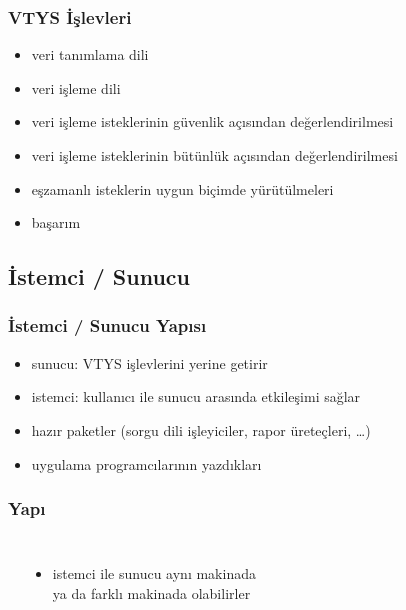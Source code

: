 \documentclass[dvipsnames]{beamer}
\theoremstyle{plain}
\begin{document}
\begin{frame}
  \frametitle{VTYS İşlevleri}

  \begin{itemize}
    \item veri tanımlama dili
    \item veri işleme dili

    \pause
    \medskip
    \item veri işleme isteklerinin güvenlik açısından değerlendirilmesi 
    \item veri işleme isteklerinin bütünlük açısından değerlendirilmesi
    \item eşzamanlı isteklerin uygun biçimde yürütülmeleri
    \item başarım
  \end{itemize}
\end{frame}

\subsection{İstemci / Sunucu}

\begin{frame}
  \frametitle{İstemci / Sunucu Yapısı}

  \begin{itemize}
    \item \alert{sunucu}: VTYS işlevlerini yerine getirir

    \bigskip
    \item \alert{istemci}: kullanıcı ile sunucu arasında etkileşimi sağlar
    \item hazır paketler (sorgu dili işleyiciler, rapor üreteçleri, \ldots)
    \item uygulama programcılarının yazdıkları
  \end{itemize}
\end{frame}

\begin{frame}
  \frametitle{Yapı}

  \begin{columns}
    \begin{center}
    \end{center}

    \begin{itemize}
      \item istemci ile sunucu aynı makinada\\
        ya da farklı makinada olabilirler
    \end{itemize}
  \end{columns}
\end{frame}
\end{document}
